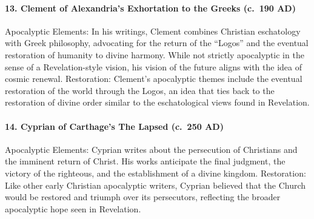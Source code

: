 \paragraph{13.
Clement of Alexandria's Exhortation to the Greeks (c.~190 AD)}\label{par:clement-of-alexandrias-exhortation-to-the-greeks-c.-190-ad}

Apocalyptic Elements: In his writings, Clement combines Christian eschatology with Greek philosophy, advocating for the return of the ``Logos'' and the eventual restoration of humanity to divine harmony.
While not strictly apocalyptic in the sense of a Revelation-style vision, his vision of the future aligns with the idea of cosmic renewal.
Restoration: Clement's apocalyptic themes include the eventual restoration of the world through the Logos, an idea that ties back to the restoration of divine order similar to the eschatological views found in Revelation.

\paragraph{14.
Cyprian of Carthage's The Lapsed (c.~250 AD)}\label{par:cyprian-of-carthages-the-lapsed-c.-250-ad}

Apocalyptic Elements: Cyprian writes about the persecution of Christians and the imminent return of Christ.
His works anticipate the final judgment, the victory of the righteous, and the establishment of a divine kingdom.
Restoration: Like other early Christian apocalyptic writers, Cyprian believed that the Church would be restored and triumph over its persecutors, reflecting the broader apocalyptic hope seen in Revelation.
